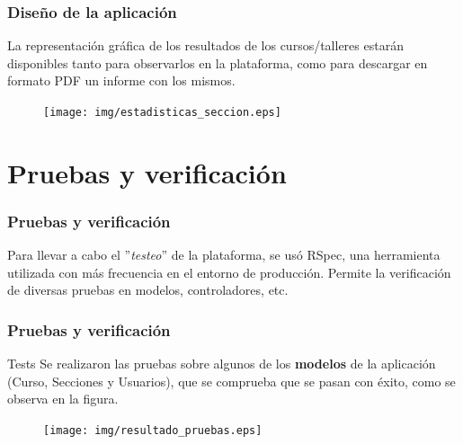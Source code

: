 \documentclass{beamer}
\begin{document}
\begin{frame}
\frametitle{Diseño de la aplicación}

La representación gráfica de los resultados de los cursos/talleres estarán disponibles tanto para observarlos en la plataforma, como para descargar en formato PDF un informe con los mismos.

\begin{figure}
    \texttt{[image: img/estadisticas\_seccion.eps]}
\end{figure}

\end{frame}


\section{Pruebas y verificación}
\begin{frame}
\frametitle{Pruebas y verificación}

Para llevar a cabo el ''\textit{testeo}'' de la plataforma, se usó RSpec, una herramienta utilizada con más frecuencia en el entorno de producción. Permite la verificación de diversas pruebas en modelos,
controladores, etc.

\begin{figure}[!th]%
    \centering
    \qquad
\end{figure}

\end{frame}
\begin{frame}
\frametitle{Pruebas y verificación}

\begin{exampleblock}{Tests}
    Se realizaron las pruebas sobre algunos de los \textbf{modelos} de la aplicación (Curso, Secciones y Usuarios), que se comprueba que se pasan con éxito, como se observa en la figura.
\end{exampleblock}

\begin{figure}
    \texttt{[image: img/resultado\_pruebas.eps]}
\end{figure}

\end{frame}
\end{document}
